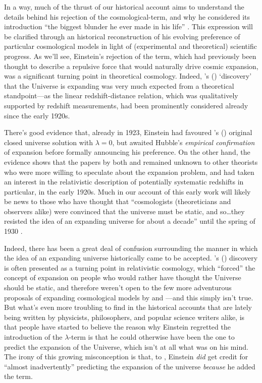 \documentclass[12 pt]{article}
\def\citeapos#1{\citeauthor{#1}'s (\citeyear{#1})}
\begin{document}
In a way, much of the thrust of our historical account aims to understand the details behind his rejection of the cosmological-term, and why he considered its introduction ``the biggest blunder he ever made in his life'' \citep{Gamow1970}. This expression will be clarified through an historical reconstruction of his evolving preference of particular cosmological models in light of (experimental and theoretical) scientific progress. As we'll see, Einstein's rejection of the term, which had previously been thought to describe a repulsive force that would naturally drive cosmic expansion, was a significant turning point in theoretical cosmology. Indeed, \citeapos{Hubble1929} `discovery' that the Universe is expanding was very much expected from a theoretical standpoint---as the linear redshift-distance relation, which was qualitatively supported by redshift measurements, had been prominently considered already since the early 1920s. 

There's good evidence that, already in 1923, Einstein had favoured \citeapos{Friedmann1922} original closed universe solution with $\lambda=0$, but awaited Hubble's \textit{empirical confirmation} of expansion before formally announcing his preference. On the other hand, the evidence shows that the papers by both \citet{Friedmann1922,Friedmann1924} and \citet{Lemaitre1927} remained unknown to other theorists who were more willing to speculate about the expansion problem, and had taken an interest in the relativistic description of potentially systematic redshifts in particular, in the early 1920s. Much in our account of this early work will likely be news to those who have thought that ``cosmologists (theoreticians and observers alike) were convinced that the universe must be static, and so\ldots they resisted the idea of an expanding universe for about a decade'' until the spring of 1930 \citep{Ellis1999}.

Indeed, there has been a great deal of confusion surrounding the manner in which the idea of an expanding universe historically came to be accepted. \citeapos{Hubble1929} discovery is often presented as a turning point in relativistic cosmology, which ``forced'' the concept of expansion on people who would rather have thought the Universe should be static, and therefore weren't open to the few more adventurous proposals of expanding cosmological models by \citet{Friedmann1922,Friedmann1924} and \citet{Lemaitre1927}---and this simply isn't true. But what's even more troubling to find in the historical accounts that are lately being written by physicists, philosophers, and popular science writers alike, is that people have started to believe the reason why Einstein regretted the introduction of the $\lambda$-term is that he could otherwise have been the one to predict the expansion of the Universe, which isn't at all what was on his mind. The irony of this growing misconception is that, to \citet{Eddington1933}, Einstein \textit{did} get credit for ``almost inadvertently'' predicting the expansion of the universe \textit{because} he added the term.
\end{document}

